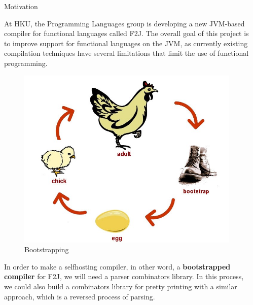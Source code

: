 \documentclass[final]{beamer}
\newlength{\sepwid}
\newlength{\onecolwid}
\begin{document}
\begin{frame}[t]
\begin{columns}[t]
\begin{column}{\onecolwid}

\begin{block}{Motivation}

At HKU, the Programming Languages group is developing a new JVM-based compiler for functional languages called F2J. The overall goal of this project is to improve support for functional languages on the JVM, as currently existing compilation techniques have several limitations that limit the use of functional programming.

\begin{figure}
\includegraphics[width=0.8\linewidth]{img/bootstrapping.jpg}
\caption{Bootstrapping}
\end{figure}

In order to make a selfhosting compiler, in other word, a \textbf{bootstrapped compiler} for F2J, we will need a parser combinators library. In this process, we could also build a combinators library for pretty printing with a similar approach, which is a reversed process of parsing.

\end{block}




\end{column} %

\begin{column}{\sepwid}\end{column} %


\end{columns}
\end{frame}
\end{document}
